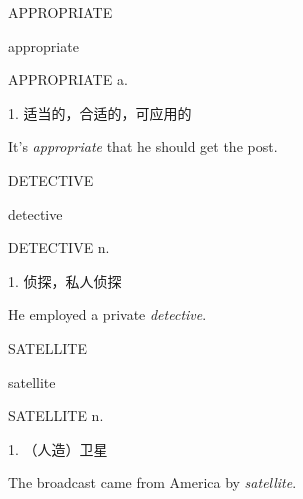 \begin{flashcard}{
APPROPRIATE

appropriate
}
\begin{center}
APPROPRIATE a. 
\end{center}
1. 适当的，合适的，可应用的

It's \textit{appropriate} that he should get the post.

\end{flashcard}
\begin{flashcard}{
DETECTIVE

detective
}
\begin{center}
DETECTIVE n. 
\end{center}
1. 侦探，私人侦探

He employed a private \textit{detective}.

\end{flashcard}
\begin{flashcard}{
SATELLITE

satellite
}
\begin{center}
SATELLITE n. 
\end{center}
1. （人造）卫星

The broadcast came from America by \textit{satellite}.

\end{flashcard}
